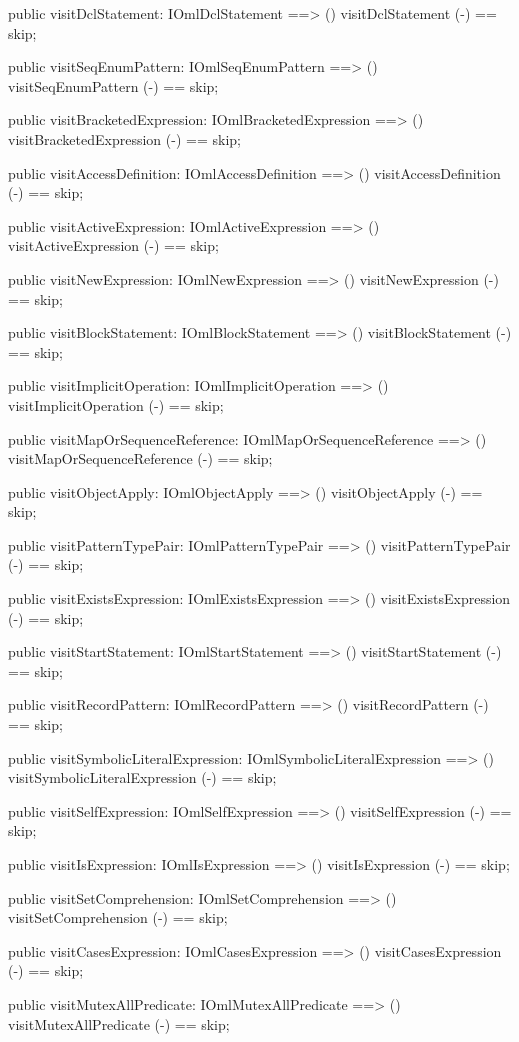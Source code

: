 \begin{vdm_al}
  public visitDclStatement: IOmlDclStatement ==> ()
  visitDclStatement (-) == skip;

  public visitSeqEnumPattern: IOmlSeqEnumPattern ==> ()
  visitSeqEnumPattern (-) == skip;

  public visitBracketedExpression: IOmlBracketedExpression ==> ()
  visitBracketedExpression (-) == skip;

  public visitAccessDefinition: IOmlAccessDefinition ==> ()
  visitAccessDefinition (-) == skip;

  public visitActiveExpression: IOmlActiveExpression ==> ()
  visitActiveExpression (-) == skip;

  public visitNewExpression: IOmlNewExpression ==> ()
  visitNewExpression (-) == skip;

  public visitBlockStatement: IOmlBlockStatement ==> ()
  visitBlockStatement (-) == skip;

  public visitImplicitOperation: IOmlImplicitOperation ==> ()
  visitImplicitOperation (-) == skip;

  public visitMapOrSequenceReference: IOmlMapOrSequenceReference ==> ()
  visitMapOrSequenceReference (-) == skip;

  public visitObjectApply: IOmlObjectApply ==> ()
  visitObjectApply (-) == skip;

  public visitPatternTypePair: IOmlPatternTypePair ==> ()
  visitPatternTypePair (-) == skip;

  public visitExistsExpression: IOmlExistsExpression ==> ()
  visitExistsExpression (-) == skip;

  public visitStartStatement: IOmlStartStatement ==> ()
  visitStartStatement (-) == skip;

  public visitRecordPattern: IOmlRecordPattern ==> ()
  visitRecordPattern (-) == skip;

  public visitSymbolicLiteralExpression: IOmlSymbolicLiteralExpression ==> ()
  visitSymbolicLiteralExpression (-) == skip;

  public visitSelfExpression: IOmlSelfExpression ==> ()
  visitSelfExpression (-) == skip;

  public visitIsExpression: IOmlIsExpression ==> ()
  visitIsExpression (-) == skip;

  public visitSetComprehension: IOmlSetComprehension ==> ()
  visitSetComprehension (-) == skip;

  public visitCasesExpression: IOmlCasesExpression ==> ()
  visitCasesExpression (-) == skip;

  public visitMutexAllPredicate: IOmlMutexAllPredicate ==> ()
  visitMutexAllPredicate (-) == skip;


\end{vdm_al}
